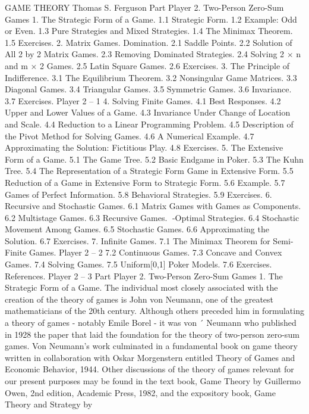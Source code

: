 GAME THEORY
Thomas S. Ferguson
Part Player 2. Two-Person Zero-Sum Games
1. The Strategic Form of a Game.
1.1 Strategic Form.
1.2 Example: Odd or Even.
1.3 Pure Strategies and Mixed Strategies.
1.4 The Minimax Theorem.
1.5 Exercises.
2. Matrix Games. Domination.
2.1 Saddle Points.
2.2 Solution of All 2 by 2 Matrix Games.
2.3 Removing Dominated Strategies.
2.4 Solving 2 × n and m × 2 Games.
2.5 Latin Square Games.
2.6 Exercises.
3. The Principle of Indifference.
3.1 The Equilibrium Theorem.
3.2 Nonsingular Game Matrices.
3.3 Diagonal Games.
3.4 Triangular Games.
3.5 Symmetric Games.
3.6 Invariance.
3.7 Exercises.
Player 2 – 1
4. Solving Finite Games.
4.1 Best Responses.
4.2 Upper and Lower Values of a Game.
4.3 Invariance Under Change of Location and Scale.
4.4 Reduction to a Linear Programming Problem.
4.5 Description of the Pivot Method for Solving Games.
4.6 A Numerical Example.
4.7 Approximating the Solution: Fictitious Play.
4.8 Exercises.
5. The Extensive Form of a Game.
5.1 The Game Tree.
5.2 Basic Endgame in Poker.
5.3 The Kuhn Tree.
5.4 The Representation of a Strategic Form Game in Extensive Form.
5.5 Reduction of a Game in Extensive Form to Strategic Form.
5.6 Example.
5.7 Games of Perfect Information.
5.8 Behavioral Strategies.
5.9 Exercises.
6. Recursive and Stochastic Games.
6.1 Matrix Games with Games as Components.
6.2 Multistage Games.
6.3 Recursive Games. -Optimal Strategies.
6.4 Stochastic Movement Among Games.
6.5 Stochastic Games.
6.6 Approximating the Solution.
6.7 Exercises.
7. Infinite Games.
7.1 The Minimax Theorem for Semi-Finite Games.
Player 2 – 2
7.2 Continuous Games.
7.3 Concave and Convex Games.
7.4 Solving Games.
7.5 Uniform[0,1] Poker Models.
7.6 Exercises.
References.
Player 2 – 3
Part Player 2. Two-Person Zero-Sum Games
1. The Strategic Form of a Game.
The individual most closely associated with the creation of the theory of games is
John von Neumann, one of the greatest mathematicians of the 20th century. Although
others preceded him in formulating a theory of games - notably Emile Borel - it was von ´
Neumann who published in 1928 the paper that laid the foundation for the theory of
two-person zero-sum games. Von Neumann’s work culminated in a fundamental book on
game theory written in collaboration with Oskar Morgenstern entitled Theory of Games
and Economic Behavior, 1944. Other discussions of the theory of games relevant for our
present purposes may be found in the text book, Game Theory by Guillermo Owen, 2nd
edition, Academic Press, 1982, and the expository book, Game Theory and Strategy by
